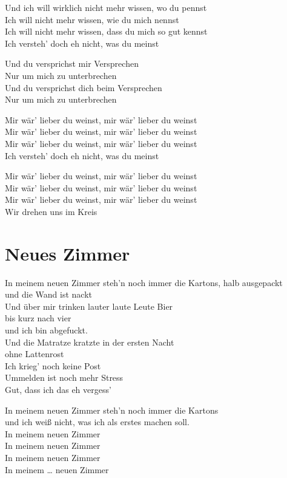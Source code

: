 \documentclass[]{book}
\begin{document}
Und ich will wirklich nicht mehr wissen, wo du pennst\\
Ich will nicht mehr wissen, wie du mich nennst\\
Ich will nicht mehr wissen, dass du mich so gut kennst\\
Ich versteh' doch eh nicht, was du meinst

Und du versprichst mir Versprechen\\
Nur um mich zu unterbrechen\\
Und du versprichst dich beim Versprechen\\
Nur um mich zu unterbrechen

Mir wär' lieber du weinst, mir wär' lieber du weinst\\
Mir wär' lieber du weinst, mir wär' lieber du weinst\\
Mir wär' lieber du weinst, mir wär' lieber du weinst\\
Ich versteh' doch eh nicht, was du meinst

Mir wär' lieber du weinst, mir wär' lieber du weinst\\
Mir wär' lieber du weinst, mir wär' lieber du weinst\\
Mir wär' lieber du weinst, mir wär' lieber du weinst\\
Wir drehen uns im Kreis

\hypertarget{neues-zimmer-2}{%
\section{Neues Zimmer}\label{neues-zimmer-2}}

In meinem neuen Zimmer steh'n noch immer die Kartons, halb ausgepackt\\
und die Wand ist nackt\\
Und über mir trinken lauter laute Leute Bier\\
bis kurz nach vier\\
und ich bin abgefuckt.\\
Und die Matratze kratzte in der ersten Nacht\\
ohne Lattenrost\\
Ich krieg' noch keine Post\\
Ummelden ist noch mehr Stress\\
Gut, dass ich das eh vergess'

In meinem neuen Zimmer steh'n noch immer die Kartons\\
und ich weiß nicht, was ich als erstes machen soll.\\
In meinem neuen Zimmer\\
In meinem neuen Zimmer\\
In meinem neuen Zimmer\\
In meinem \ldots{} neuen Zimmer
\end{document}
